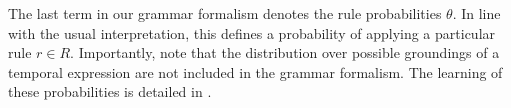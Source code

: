 The last term in our grammar formalism denotes the rule probabilities $\theta$.
In line with the usual interpretation, this defines a probability
	of applying a particular rule $r \in R$.
Importantly, note that the distribution over possible groundings
	of a temporal expression are not included in the grammar
	formalism.
The learning of these probabilities is detailed in .



